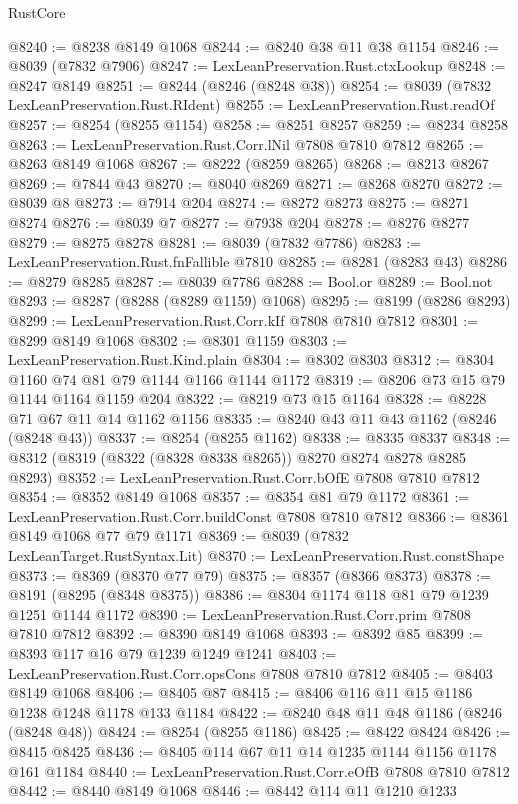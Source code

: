 \begin{lexlean}{RustCore}
\begin{coremodule}
@8240 := @8238 @8149 @1068
@8244 := @8240 @38 @11 @38 @1154
@8246 := @8039 (@7832 @7906)
@8247 := LexLeanPreservation.Rust.ctxLookup
@8248 := @8247 @8149
@8251 := @8244 (@8246 (@8248 @38))
@8254 := @8039 (@7832 LexLeanPreservation.Rust.RIdent)
@8255 := LexLeanPreservation.Rust.readOf
@8257 := @8254 (@8255 @1154)
@8258 := @8251 @8257
@8259 := @8234 @8258
@8263 := LexLeanPreservation.Rust.Corr.lNil @7808 @7810 @7812
@8265 := @8263 @8149 @1068
@8267 := @8222 (@8259 @8265)
@8268 := @8213 @8267
@8269 := @7844 @43
@8270 := @8040 @8269
@8271 := @8268 @8270
@8272 := @8039 @8
@8273 := @7914 @204
@8274 := @8272 @8273
@8275 := @8271 @8274
@8276 := @8039 @7
@8277 := @7938 @204
@8278 := @8276 @8277
@8279 := @8275 @8278
@8281 := @8039 (@7832 @7786)
@8283 := LexLeanPreservation.Rust.fnFallible @7810
@8285 := @8281 (@8283 @43)
@8286 := @8279 @8285
@8287 := @8039 @7786
@8288 := Bool.or
@8289 := Bool.not
@8293 := @8287 (@8288 (@8289 @1159) @1068)
@8295 := @8199 (@8286 @8293)
@8299 := LexLeanPreservation.Rust.Corr.kIf @7808 @7810 @7812
@8301 := @8299 @8149 @1068
@8302 := @8301 @1159
@8303 := LexLeanPreservation.Rust.Kind.plain
@8304 := @8302 @8303
@8312 := @8304 @1160 @74 @81 @79 @1144 @1166 @1144 @1172
@8319 := @8206 @73 @15 @79 @1144 @1164 @1159 @204
@8322 := @8219 @73 @15 @1164
@8328 := @8228 @71 @67 @11 @14 @1162 @1156
@8335 := @8240 @43 @11 @43 @1162 (@8246 (@8248 @43))
@8337 := @8254 (@8255 @1162)
@8338 := @8335 @8337
@8348 := @8312 (@8319 (@8322 (@8328 @8338 @8265)) @8270 @8274 @8278 @8285 @8293)
@8352 := LexLeanPreservation.Rust.Corr.bOfE @7808 @7810 @7812
@8354 := @8352 @8149 @1068
@8357 := @8354 @81 @79 @1172
@8361 := LexLeanPreservation.Rust.Corr.buildConst @7808 @7810 @7812
@8366 := @8361 @8149 @1068 @77 @79 @1171
@8369 := @8039 (@7832 LexLeanTarget.RustSyntax.Lit)
@8370 := LexLeanPreservation.Rust.constShape
@8373 := @8369 (@8370 @77 @79)
@8375 := @8357 (@8366 @8373)
@8378 := @8191 (@8295 (@8348 @8375))
@8386 := @8304 @1174 @118 @81 @79 @1239 @1251 @1144 @1172
@8390 := LexLeanPreservation.Rust.Corr.prim @7808 @7810 @7812
@8392 := @8390 @8149 @1068
@8393 := @8392 @85
@8399 := @8393 @117 @16 @79 @1239 @1249 @1241
@8403 := LexLeanPreservation.Rust.Corr.opsCons @7808 @7810 @7812
@8405 := @8403 @8149 @1068
@8406 := @8405 @87
@8415 := @8406 @116 @11 @15 @1186 @1238 @1248 @1178 @133 @1184
@8422 := @8240 @48 @11 @48 @1186 (@8246 (@8248 @48))
@8424 := @8254 (@8255 @1186)
@8425 := @8422 @8424
@8426 := @8415 @8425
@8436 := @8405 @114 @67 @11 @14 @1235 @1144 @1156 @1178 @161 @1184
@8440 := LexLeanPreservation.Rust.Corr.eOfB @7808 @7810 @7812
@8442 := @8440 @8149 @1068
@8446 := @8442 @114 @11 @1210 @1233

\end{coremodule}
\end{lexlean}
